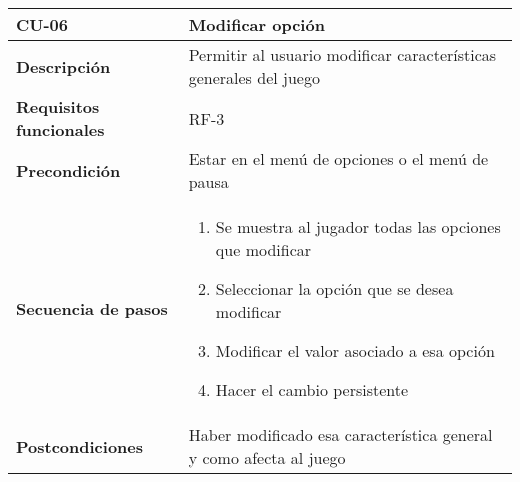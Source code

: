 \begin{longtable}{l|l}
\begin{minipage}{0.25\columnwidth}
\textbf{CU-06} 
\end{minipage}
&
\begin{minipage}{0.65\columnwidth}
Modificar opción
\end{minipage}
\\ \hline

\begin{minipage}{0.25\columnwidth}
\textbf{Descripción} 
\end{minipage}
&
\begin{minipage}{0.65\columnwidth}
Permitir al usuario modificar características generales del juego
\end{minipage}
\\ \hline

\begin{minipage}{0.25\columnwidth}
\textbf{Requisitos funcionales} 
\end{minipage}
&
\begin{minipage}{0.65\columnwidth}
RF-3
\end{minipage}
\\ \hline

\begin{minipage}{0.25\columnwidth}
\textbf{Precondición} 
\end{minipage}
&
\begin{minipage}{0.65\columnwidth}
Estar en el menú de opciones o el menú de pausa
\end{minipage}
\\ \hline

\begin{minipage}{0.25\columnwidth}
\textbf{Secuencia de pasos} 
\end{minipage}
&
\begin{minipage}{0.65\columnwidth}
\begin{enumerate}
\item
Se muestra al jugador todas las opciones que modificar
\item
Seleccionar la opción que se desea modificar
\item
Modificar el valor asociado a esa opción
\item
Hacer el cambio persistente
\end{enumerate}
\end{minipage}
\\ \hline

\begin{minipage}{0.25\columnwidth}
\textbf{Postcondiciones} 
\end{minipage}
&
\begin{minipage}{0.65\columnwidth}
Haber modificado esa característica general y como afecta al juego
\end{minipage}
\\ \hline


\end{longtable}

